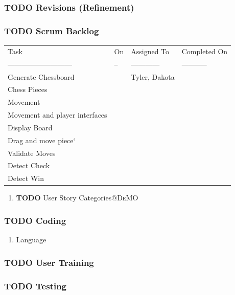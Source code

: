 \documentclass[11pt]{article}
\begin{document}
\subsubsection{{\bfseries\sffamily TODO} Revisions (Refinement)}
\label{sec:org5b4df41}
\subsubsection{{\bfseries\sffamily TODO} Scrum Backlog}
\label{sec:orgd4d0be1}
\begin{center}
\begin{tabular}{llll}
Task & On & Assigned To & Completed On\\
--------------------------- & -- & ------------ & -----------\\
Generate Chessboard &  & Tyler, Dakota & \\
Chess Pieces &  &  & \\
Movement &  &  & \\
Movement and player interfaces &  &  & \\
Display Board &  &  & \\
Drag and move piece` &  &  & \\
Validate Moves &  &  & \\
Detect Check &  &  & \\
Detect Win &  &  & \\
\end{tabular}
\end{center}
\begin{enumerate}
\item {\bfseries\sffamily TODO} User Story Categories\hfill{}\textsc{@DeMO}
\label{sec:orga8848ce}
\end{enumerate}
\subsubsection{{\bfseries\sffamily TODO} Coding}
\label{sec:org4b2b945}
\begin{enumerate}
\item Language
\label{sec:org4a1abf2}
\end{enumerate}
\subsubsection{{\bfseries\sffamily TODO} User Training}
\label{sec:org1d1a3e3}
\subsubsection{{\bfseries\sffamily TODO} Testing}
\label{sec:org2bf856a}
\end{document}
